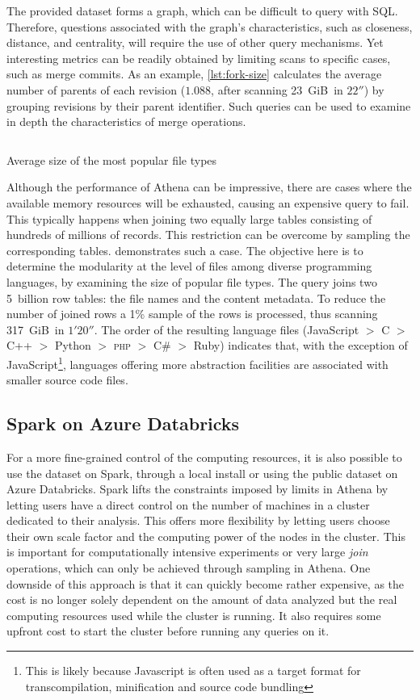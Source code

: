 The provided dataset forms a graph, which can be difficult to query with SQL\@.
Therefore, questions associated with the graph's characteristics,
such as closeness, distance, and centrality, will require the use of
other query mechanisms.
Yet interesting metrics can be readily obtained by limiting scans
to specific cases, such as merge commits.
As an example, \cref{lst:fork-size} calculates the average
number of parents of each revision ($1.088$, after scanning 23~GiB\ in $22''$)
by grouping revisions by their parent identifier.
Such queries can be used to examine in depth the characteristics
of merge operations.

\begin{listing}
    \inputminted[firstline=4]{sql}{codesamples/graph-dataset/file-type-size.sql}
    \caption{Average size of the most popular file types}%
    \label{lst:file-type-size}
\end{listing}

Although the performance of Athena can be impressive, there are cases where the
available memory resources will be exhausted, causing an expensive query to
fail.
This typically happens when joining two equally large tables consisting of
hundreds of millions of records.
This restriction can be overcome by sampling the corresponding tables.
 demonstrates such a case.
The objective here is to determine the modularity at the level of files among
diverse programming languages, by examining the size of popular file types.
The query joins two 5~billion row tables:
the file names and the content metadata.
To reduce the number of joined rows a 1\% sample of the rows is processed,
thus scanning 317~GiB\ in $1'20''$.
The order of the resulting language files
(JavaScript $>$ C $>$ C++ $>$ Python $>$ \textsc{php} $>$ C\# $>$ Ruby)
indicates that, with the exception of JavaScript\footnote{This is likely
    because Javascript is often used as a target format for transcompilation,
    minification and source code bundling}, languages offering more abstraction
    facilities are associated with smaller source code files.

\subsection{Spark on Azure Databricks}

For a more fine-grained control of the computing resources, it is also possible
to use the dataset on Spark, through a local install or using the public
dataset on Azure Databricks. Spark lifts the constraints imposed by limits in
Athena by letting users have a direct control on the number of machines in a
cluster dedicated to their analysis. This offers more flexibility by letting
users choose their own scale factor and the computing power of the nodes in the
cluster.  This is important for computationally intensive experiments or very
large \emph{join} operations, which can only be achieved through sampling in
Athena. One downside of this approach is that it can quickly become rather
expensive, as the cost is no longer solely dependent on the amount of data
analyzed but the real computing resources used while the cluster is running. It
also requires some upfront cost to start the cluster before running any queries
on it.

